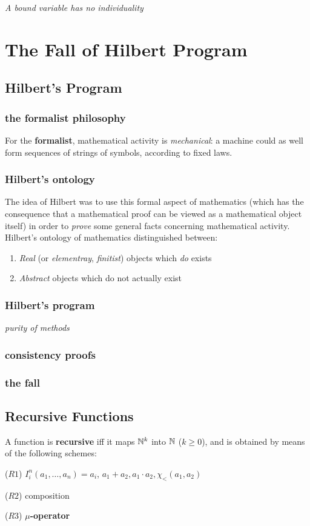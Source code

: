 \documentclass[11pt]{article}
\begin{document}
\emph{A bound variable has no individuality}
\section{The Fall of Hilbert Program}
\label{sec:orgbcbcbd6}
\subsection{Hilbert's Program}
\label{sec:org1d1ce37}
\subsubsection{the formalist philosophy}
\label{sec:orgf0c1ec9}
For the \textbf{formalist}, mathematical activity is \emph{mechanical}: a machine could as well
form sequences of strings of symbols, according to fixed laws.
\subsubsection{Hilbert's ontology}
\label{sec:org05c1d3c}
The idea of Hilbert was to use this formal aspect of mathematics (which has the
consequence that a mathematical proof can be viewed as a mathematical object
itself) in order to \emph{prove} some general facts concerning mathematical activity.
Hilbert's ontology of mathematics distinguished between:
\begin{enumerate}
\item \emph{Real} (or \emph{elementray}, \emph{finitist}) objects which \emph{do} exists
\item \emph{Abstract} objects which do not actually exist
\end{enumerate}
\subsubsection{Hilbert's program}
\label{sec:org2cec945}
\emph{purity of methods}
\subsubsection{consistency proofs}
\label{sec:org92f7e63}
\subsubsection{the fall}
\label{sec:org27fc627}
\subsection{Recursive Functions}
\label{sec:orgcaec614}
\begin{definition}[]
A function is \textbf{recursive} iff it maps \(\mathbb{N}^k\) into \(\mathbb{N}\) (\(k\ge 0\)), and is obtained
by means of the following schemes:

(\(R1\)) \(I_i^n(a_1,\dots,a_n)=a_i\), \(a_1+a_2,a_1\cdot a_2,\chi_<(a_1,a_2)\)

(\(R2\)) composition

(\(R3\)) \textbf{\(\mu\)-operator}
\end{definition}
\end{document}

